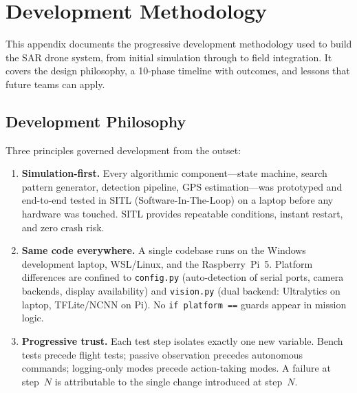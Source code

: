 \section{Development Methodology}\label{app:dev-methodology}

This appendix documents the progressive development methodology used to
build the SAR drone system, from initial simulation through to field
integration.  It covers the design philosophy, a 10-phase timeline with
outcomes, and lessons that future teams can apply.

\subsection{Development Philosophy}\label{sec:dev-philosophy}

Three principles governed development from the outset:

\begin{enumerate}[leftmargin=1.5em]
  \item \textbf{Simulation-first.}  Every algorithmic component---state
        machine, search pattern generator, detection pipeline, GPS
        estimation---was prototyped and end-to-end tested in SITL
        (Software-In-The-Loop) on a laptop before any hardware was
        touched.  SITL provides repeatable conditions, instant restart,
        and zero crash risk.

  \item \textbf{Same code everywhere.}  A single codebase runs on the
        Windows development laptop, WSL/Linux, and the Raspberry~Pi~5.
        Platform differences are confined to \texttt{config.py}
        (auto-detection of serial ports, camera backends, display
        availability) and \texttt{vision.py} (dual backend:
        Ultralytics on laptop, TFLite/NCNN on Pi).  No
        \texttt{if platform ==} guards appear in mission logic.

  \item \textbf{Progressive trust.}  Each test step isolates exactly
        one new variable.  Bench tests precede flight tests; passive
        observation precedes autonomous commands; logging-only modes
        precede action-taking modes.  A failure at step~$N$ is
        attributable to the single change introduced at step~$N$.
\end{enumerate}


